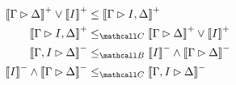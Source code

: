 \begin{lemma}
  \begin{align}
    \psint{\Gamma \J \Delta} \lor \psint{I} &\sement \psint{\Gamma \J I, \Delta} \label{app:eqn:weakdistrib-one} \\
    \psint{\Gamma \J I, \Delta} &\sementC \psint{\Gamma \J \Delta} \lor \psint{I} \label{app:eqn:weakdistrib-two} \\
    \nsint{\Gamma, I \J \Delta} &\sementB \nsint{I} \land \nsint{\Gamma \J \Delta} \label{app:eqn:weakdistrib-three} \\
    \nsint{I} \land \nsint{\Gamma \J \Delta} &\sementC \nsint{\Gamma, I \J \Delta} \label{app:eqn:weakdistrib-four}
  \end{align}
\end{lemma}
